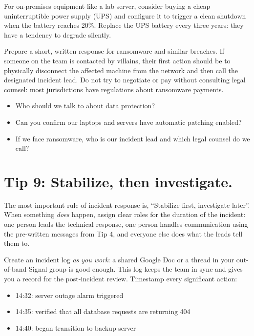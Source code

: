 \documentclass[10pt,letterpaper]{article}
\begin{document}
For on-premises equipment like a lab server, consider buying a cheap
uninterruptible power supply (UPS) and configure it to trigger a clean shutdown
when the battery reaches 20\%.  Replace the UPS battery every three years: they
have a tendency to degrade silently.

Prepare a short, written response for ransomware and similar breaches. If
someone on the team is contacted by villains, their first action should be to
physically disconnect the affected machine from the network and then call the
designated incident lead. Do not try to negotiate or pay without consulting
legal counsel: most jurisdictions have regulations about ransomware payments.

\begin{notebox}
  \begin{itemize}
  \item Who should we talk to about data protection?
  \item Can you confirm our laptops and servers have automatic patching enabled?
  \item If we face ransomware, who is our incident lead and which legal counsel do we call?
  \end{itemize}
\end{notebox}

\section*{Tip 9: Stabilize, then investigate.}

The most important rule of incident response is, ``Stabilize first, investigate
later''.  When something \emph{does} happen, assign clear roles for the duration
of the incident: one person leads the technical response, one person handles
communication using the pre-written messages from Tip 4, and everyone else does
what the leads tell them to.

Create an incident log \emph{as you work}: a shared Google Doc or a thread in
your out-of-band Signal group is good enough.  This log keeps the team in sync
and gives you a record for the post-incident review.  Timestamp every
significant action:

\begin{itemize}
\item 14:32: server outage alarm triggered
\item 14:35: verified that all database requests are returning 404
\item 14:40: began transition to backup server
\end{itemize}
\end{document}
